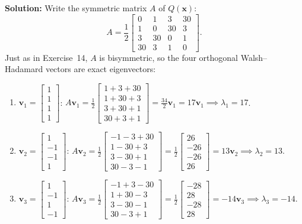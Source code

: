\documentclass[11pt, letterpaper]{article}
\theoremstyle{definition}
\theoremstyle{remark}
\begin{document}
\textbf{Solution:}
Write the symmetric matrix $A$ of $Q(\mathbf{x})$:
\[
A = \frac{1}{2} \begin{bmatrix} 0 & 1 & 3 & 30 \\ 1 & 0 & 30 & 3 \\ 3 & 30 & 0 & 1 \\ 30 & 3 & 1 & 0 \end{bmatrix}.
\]
Just as in Exercise~14, $A$ is bisymmetric, so the four orthogonal Walsh–Hadamard vectors are exact eigenvectors:
\begin{enumerate}[label=(\arabic*)]
    \item $\mathbf{v}_1 = \begin{bmatrix} 1 \\ 1 \\ 1 \\ 1 \end{bmatrix}$: \quad $A\mathbf{v}_1 = \frac{1}{2}\begin{bmatrix} 1+3+30 \\ 1+30+3 \\ 3+30+1 \\ 30+3+1 \end{bmatrix} = \frac{34}{2}\mathbf{v}_1 = 17\mathbf{v}_1 \implies \lambda_1 = 17$.
    \item $\mathbf{v}_2 = \begin{bmatrix} 1 \\ -1 \\ -1 \\ 1 \end{bmatrix}$: \quad $A\mathbf{v}_2 = \frac{1}{2}\begin{bmatrix} -1-3+30 \\ 1-30+3 \\ 3-30+1 \\ 30-3-1 \end{bmatrix} = \frac{1}{2}\begin{bmatrix} 26 \\ -26 \\ -26 \\ 26 \end{bmatrix} = 13\mathbf{v}_2 \implies \lambda_2 = 13$.
    \item $\mathbf{v}_3 = \begin{bmatrix} 1 \\ -1 \\ 1 \\ -1 \end{bmatrix}$: \quad $A\mathbf{v}_3 = \frac{1}{2}\begin{bmatrix} -1+3-30 \\ 1+30-3 \\ 3-30-1 \\ 30-3+1 \end{bmatrix} = \frac{1}{2}\begin{bmatrix} -28 \\ 28 \\ -28 \\ 28 \end{bmatrix} = -14\mathbf{v}_3 \implies \lambda_3 = -14$.

\end{enumerate}
\end{document}
